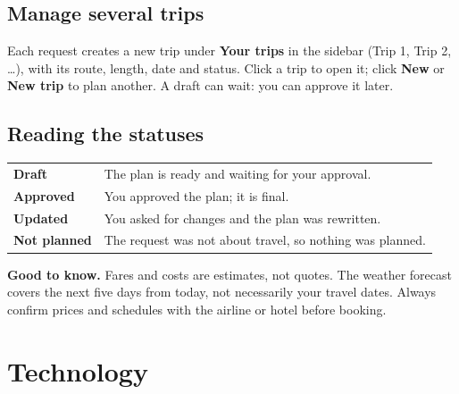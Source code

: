 \documentclass[11pt,a4paper]{article}
\begin{document}
\subsection{Manage several trips}
Each request creates a new trip under \textbf{Your trips} in the sidebar (Trip 1, Trip 2, \dots), with its route, length, date and status. Click a trip to open it; click \textbf{New} or \textbf{New trip} to plan another. A draft can wait: you can approve it later.

\subsection{Reading the statuses}
\begin{tabularx}{\linewidth}{@{}>{\bfseries}p{28mm}L@{}}
\toprule
\leavevmode\color{amber}Draft & The plan is ready and waiting for your approval. \\
\leavevmode\color{accent}Approved & You approved the plan; it is final. \\
\leavevmode\color{slatechart}Updated & You asked for changes and the plan was rewritten. \\
\leavevmode\color{bad}Not planned & The request was not about travel, so nothing was planned. \\
\bottomrule
\end{tabularx}

\begin{notebox}
\textbf{Good to know.} Fares and costs are estimates, not quotes. The weather forecast covers the next five days from today, not necessarily your travel dates. Always confirm prices and schedules with the airline or hotel before booking.
\end{notebox}

\section{Technology}
\end{document}
